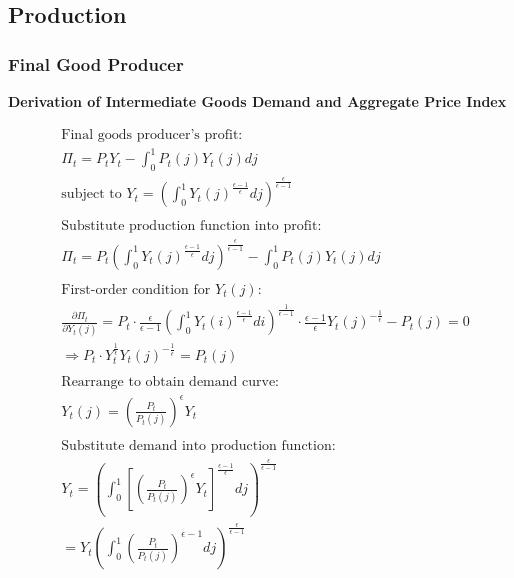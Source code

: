 \documentclass[11pt,preprint]{elsarticle}
\numberwithin{equation}{section}
\numberwithin{figure}{section}
\numberwithin{table}{section}
\begin{document}
\subsection{Production}\label{production-1}

\subsubsection{\texorpdfstring{Final Good Producer
\label{final_good_producer_appendix}}{Final Good Producer }}\label{final-good-producer}

\textbf{Derivation of Intermediate Goods Demand and Aggregate Price
Index}

\begin{align*}  
& \text{Final goods producer's profit:} \\  
& \Pi_t = P_t Y_t - \int_0^1 P_t(j) Y_t(j)  dj \\  
& \text{subject to } Y_t = \left( \int_0^1 Y_t(j)^{\frac{\epsilon-1}{\epsilon}}  dj \right)^{\frac{\epsilon}{\epsilon-1}} \\  
& \\  
& \text{Substitute production function into profit:} \\  
& \Pi_t = P_t \left( \int_0^1 Y_t(j)^{\frac{\epsilon-1}{\epsilon}}  dj \right)^{\frac{\epsilon}{\epsilon-1}} - \int_0^1 P_t(j) Y_t(j)  dj \\  
& \\  
& \text{First-order condition for } Y_t(j): \\  
& \frac{\partial \Pi_t}{\partial Y_t(j)} = P_t \cdot \frac{\epsilon}{\epsilon-1} \left( \int_0^1 Y_t(i)^{\frac{\epsilon-1}{\epsilon}}  di \right)^{\frac{1}{\epsilon-1}} \cdot \frac{\epsilon-1}{\epsilon} Y_t(j)^{-\frac{1}{\epsilon}} - P_t(j) = 0 \\  
& \Rightarrow P_t \cdot Y_t^{\frac{1}{\epsilon}} Y_t(j)^{-\frac{1}{\epsilon}} = P_t(j) \\  
& \\  
& \text{Rearrange to obtain demand curve:} \\  
& Y_t(j) = \left( \frac{P_t}{P_t(j)} \right)^{\epsilon} Y_t \\  
& \\  
& \text{Substitute demand into production function:} \\  
& Y_t = \left( \int_0^1 \left[ \left( \frac{P_t}{P_t(j)} \right)^{\epsilon} Y_t \right]^{\frac{\epsilon-1}{\epsilon}}  dj \right)^{\frac{\epsilon}{\epsilon-1}} \\  
& = Y_t \left( \int_0^1 \left( \frac{P_t}{P_t(j)} \right)^{\epsilon-1}  dj \right)^{\frac{\epsilon}{\epsilon-1}} \\  

\end{align*}
\end{document}
